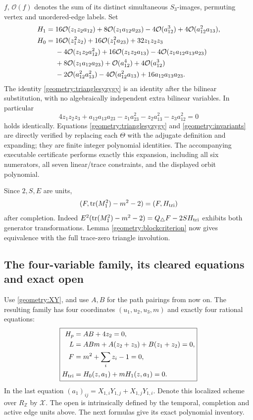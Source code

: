\documentclass[11pt,a4paper]{article}
\theoremstyle{remark}\newtheorem{remark}[theorem]{Remark}
\newcommand{\Orb}{\mathcal O}\newcommand{\length}{\operatorname{length}}
\begin{document}
\(f\), \(\Orb(f)\) denotes the sum of its distinct simultaneous
\(S_3\)-images, permuting vertex and unordered-edge labels. Set
\begin{align}
 H_1={}&16\Orb(z_1z_2a_{12})+8\Orb(z_1a_{12}a_{23})
          -4\Orb(a_{12}^3)+4\Orb(a_{12}^2a_{13}),\notag\\
 H_0={}&16\Orb(z_1^2z_2)+16\Orb(z_1^2a_{23})+32z_1z_2z_3\notag\\
 &-4\Orb(z_1z_2a_{12}^2)+16\Orb(z_1z_2a_{13})
       -4\Orb(z_1a_{12}a_{13}a_{23})\notag\\
 &+8\Orb(z_1a_{12}a_{23})+\Orb(a_{12}^4)+4\Orb(a_{12}^3)\notag\\
 &-2\Orb(a_{12}^2a_{13}^2)-4\Orb(a_{12}^2a_{13})
       +16a_{12}a_{13}a_{23}.
 \label{geometry:invariants}
\end{align}
The identity \eqref{geometry:trianglesyzygy} is an identity after the
bilinear substitution, with no algebraically independent extra bilinear
variables. In particular
\[
 4z_1z_2z_3+a_{12}a_{13}a_{23}
        -z_1a_{23}^2-z_2a_{13}^2-z_3a_{12}^2=0
\]
holds identically. Equations \eqref{geometry:trianglesyzygy} and
\eqref{geometry:invariants} are directly verified by replacing each
\(\Theta\) with the adjugate definition and expanding; they are finite
integer polynomial identities. The accompanying executable certificate
performs exactly this expansion, including all six numerators, all seven
linear/trace constraints, and the displayed orbit polynomial.

Since \(2,S,E\) are units,
\[
 (F,\operatorname{tr}(M_1^2)-m^2-2)=(F,H_{\rm tri})
\]
after completion. Indeed
\(E^2(\operatorname{tr}(M_1^2)-m^2-2)=Q_\triangle F-2SH_{\rm tri}\)
exhibits both generator transformations. Lemma
\ref{geometry:blockcriterion} now gives equivalence with the full
trace-zero triangle involution.

\subsection{The four-variable family, its cleared equations and exact open}

Use \eqref{geometry:XY}, and use \(A,B\) for the path pairings from
now on. The resulting family has four coordinates \((u_1,u_2,u_3,m)\)
and exactly four rational equations:
\begin{equation}\label{geometry:four}
 \boxed{\begin{aligned}
 H_p&=AB+4z_2=0,\\
 L&=ABm+A(z_2+z_3)+B(z_1+z_2)=0,\\
 F&=m^2+\sum_i z_i-1=0,\\
 H_{\rm tri}&=H_0(z,a_1)+mH_1(z,a_1)=0.
 \end{aligned}}
\end{equation}
In the last equation \((a_1)_{ij}=X_{1,i}Y_{1,j}+X_{1,j}Y_{1,i}\).
Denote this localized scheme over \(R_{\mathbb Z}\) by \(\mathcal X\).
The open is intrinsically defined by the temporal, completion and active
edge units above. The next formulas give its exact polynomial inventory.
\end{document}
